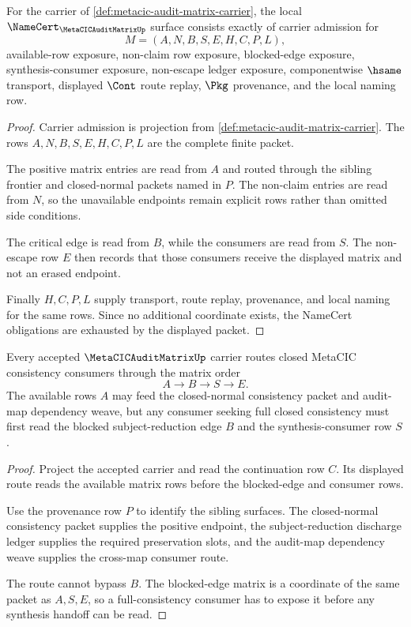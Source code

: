 \begin{theorem}
\label{thm:metacic-audit-matrix-namecert-obligations}
For the carrier of \autoref{def:metacic-audit-matrix-carrier}, the local $\NameCert_{\MetaCICAuditMatrixUp}$ surface consists exactly of carrier admission for
$$
M=(A,N,B,S,E,H,C,P,L),
$$
available-row exposure, non-claim row exposure, blocked-edge exposure, synthesis-consumer exposure, non-escape ledger exposure, componentwise $\hsame$ transport, displayed $\Cont$ route replay, $\Pkg$ provenance, and the local naming row.
\end{theorem}
\begin{proof}
Carrier admission is projection from \autoref{def:metacic-audit-matrix-carrier}. The rows $A,N,B,S,E,H,C,P,L$ are the complete finite packet.

The positive matrix entries are read from $A$ and routed through the sibling frontier and closed-normal packets named in $P$. The non-claim entries are read from $N$, so the unavailable endpoints remain explicit rows rather than omitted side conditions.

The critical edge is read from $B$, while the consumers are read from $S$. The non-escape row $E$ then records that those consumers receive the displayed matrix and not an erased endpoint.

Finally $H,C,P,L$ supply transport, route replay, provenance, and local naming for the same rows. Since no additional coordinate exists, the NameCert obligations are exhausted by the displayed packet.
\end{proof}

\begin{theorem}
\label{thm:metacic-audit-matrix-critical-path-route}
Every accepted $\MetaCICAuditMatrixUp$ carrier routes closed MetaCIC consistency consumers through the matrix order
$$
A \longrightarrow B \longrightarrow S \longrightarrow E.
$$
The available rows $A$ may feed the closed-normal consistency packet and audit-map dependency weave, but any consumer seeking full closed consistency must first read the blocked subject-reduction edge $B$ and the synthesis-consumer row $S$.
\end{theorem}
\begin{proof}
Project the accepted carrier and read the continuation row $C$. Its displayed route reads the available matrix rows before the blocked-edge and consumer rows.

Use the provenance row $P$ to identify the sibling surfaces. The closed-normal consistency packet supplies the positive endpoint, the subject-reduction discharge ledger supplies the required preservation slots, and the audit-map dependency weave supplies the cross-map consumer route.

The route cannot bypass $B$. The blocked-edge matrix is a coordinate of the same packet as $A,S,E$, so a full-consistency consumer has to expose it before any synthesis handoff can be read.
\end{proof}

